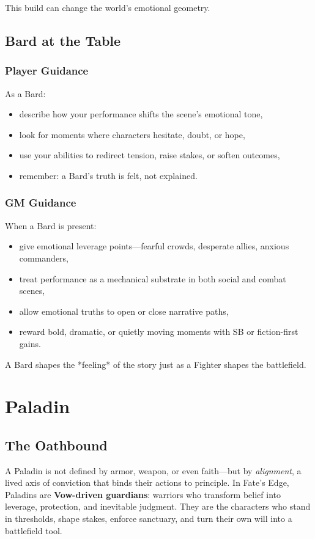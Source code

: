 \documentclass[11pt]{book}
\begin{document}
This build can change the world's emotional geometry.

\section{Bard at the Table}

\subsection{Player Guidance}

As a Bard:
\begin{itemize}
  \item describe how your performance shifts the scene's emotional tone,
  \item look for moments where characters hesitate, doubt, or hope,
  \item use your abilities to redirect tension, raise stakes, or soften outcomes,
  \item remember: a Bard's truth is felt, not explained.
\end{itemize}

\subsection{GM Guidance}

When a Bard is present:
\begin{itemize}
  \item give emotional leverage points---fearful crowds, desperate allies,
        anxious commanders,
  \item treat performance as a mechanical substrate in both social and combat scenes,
  \item allow emotional truths to open or close narrative paths,
  \item reward bold, dramatic, or quietly moving moments with SB or fiction-first gains.
\end{itemize}

A Bard shapes the *feeling* of the story just as a Fighter shapes the battlefield.


\chapter{Paladin}
\label{chap:paladin}

\section{The Oathbound}
A Paladin is not defined by armor, weapon, or even faith---but by \emph{alignment}, a lived axis
of conviction that binds their actions to principle. In Fate's Edge, Paladins are
\textbf{Vow-driven guardians}: warriors who transform belief into leverage, protection, and
inevitable judgment. They are the characters who stand in thresholds, shape stakes, enforce
sanctuary, and turn their own will into a battlefield tool.
\end{document}
